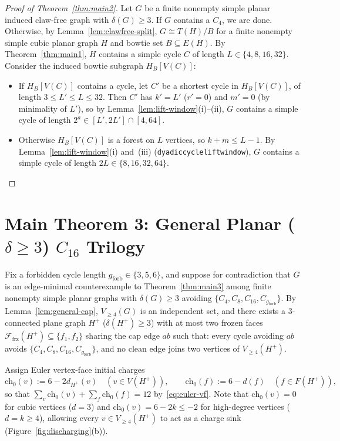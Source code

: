 \documentclass[11pt,reqno]{amsart}
\theoremstyle{plain}
\theoremstyle{definition}
\theoremstyle{remark}
\newcommand{\chz}{\mathrm{ch}_0}
\newcommand{\Ffrz}{\mathcal{F}_{\mathrm{frz}}}
\newcommand{\Vge}{V_{\ge 4}}
\DeclareRobustCommand{\_}{\ifmmode\text{\textunderscore}\else\textunderscore\allowbreak\fi}
\begin{document}
\begin{proof}[Proof of Theorem~\ref{thm:main2}]
Let $G$ be a finite nonempty simple planar induced claw-free graph with $\delta(G) \ge 3$. If $G$ contains a $C_4$, we are done. Otherwise, by Lemma~\ref{lem:clawfree-split}, $G \cong T(H)/B$ for a finite nonempty simple cubic planar graph $H$ and bowtie set $B \subseteq E(H)$. By Theorem~\ref{thm:main1}, $H$ contains a simple cycle $C$ of length $L \in \{4, 8, 16, 32\}$. Consider the induced bowtie subgraph $H_B[V(C)]$:
\begin{itemize}[leftmargin=1.8em]
  \item If $H_B[V(C)]$ contains a cycle, let $C'$ be a shortest cycle in $H_B[V(C)]$, of length $3 \le L' \le L \le 32$. Then $C'$ has $k' = L'$ ($r' = 0$) and $m' = 0$ (by minimality of $L'$), so by Lemma~\ref{lem:lift-window}(i)--(ii), $G$ contains a simple cycle of length $2^a \in [L', 2L'] \cap [4, 64]$.
  \item Otherwise $H_B[V(C)]$ is a forest on $L$ vertices, so $k + m \le L - 1$. By Lemma~\ref{lem:lift-window}(i) and~(iii) (\texttt{dyadic\_cycle\_lift\_window}), $G$ contains a simple cycle of length $2L \in \{8, 16, 32, 64\}$. \qedhere
\end{itemize}
\end{proof}

\section{Main Theorem 3: General Planar (\texorpdfstring{$\delta \ge 3$}{delta >= 3}) \texorpdfstring{$C_{16}$}{C16} Trilogy}\label{sec:trilogy}

Fix a forbidden cycle length $g_{\mathrm{forb}} \in \{3, 5, 6\}$, and suppose for contradiction that $G$ is an edge-minimal counterexample to Theorem~\ref{thm:main3} among finite nonempty simple planar graphs with $\delta(G) \ge 3$ avoiding $\{C_4, C_8, C_{16}, C_{g_{\mathrm{forb}}}\}$. By Lemma~\ref{lem:general-cap}, $\Vge(G)$ is an independent set, and there exists a $3$-connected plane graph $H^+$ ($\delta(H^+) \ge 3$) with at most two frozen faces $\Ffrz(H^+) \subseteq \{f_1, f_2\}$ sharing the cap edge $ab$ such that: every cycle avoiding $ab$ avoids $\{C_4, C_8, C_{16}, C_{g_{\mathrm{forb}}}\}$, and no clean edge joins two vertices of $\Vge(H^+)$.

Assign Euler vertex-face initial charges
\[
  \chz(v) := 6 - 2 d_{H^+}(v) \quad (v \in V(H^+)), \qquad
  \chz(f) := 6 - d(f) \quad (f \in F(H^+)),
\]
so that $\sum_v \chz(v) + \sum_f \chz(f) = 12$ by~\eqref{eq:euler-vf}. Note that $\chz(v) = 0$ for cubic vertices ($d = 3$) and $\chz(v) = 6 - 2k \le -2$ for high-degree vertices ($d = k \ge 4$), allowing every $v \in \Vge(H^+)$ to act as a charge sink (Figure~\ref{fig:discharging}(b)).
\end{document}
